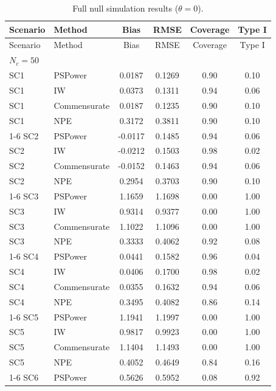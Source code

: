 \scriptsize
\setlength{\tabcolsep}{3pt}
\renewcommand{\arraystretch}{1.08}
\begin{longtable}{llcccc}
\caption{Full null simulation results ($\theta = 0$).}
\label{tab:sim-full-null}\\
\toprule
Scenario & Method & Bias & RMSE & Coverage & Type I \\
\midrule
\endfirsthead
\toprule
Scenario & Method & Bias & RMSE & Coverage & Type I \\
\midrule
\endhead
\multicolumn{6}{l}{$N_c=50$} \\
SC1 & PSPower      & 0.0187 & 0.1269 & 0.90 & 0.10 \\
SC1 & IW           & 0.0373 & 0.1311 & 0.94 & 0.06 \\
SC1 & Commensurate & 0.0187 & 0.1235 & 0.90 & 0.10 \\
SC1 & NPE          & 0.3172 & 0.3811 & 0.90 & 0.10 \\
\cmidrule(lr){1-6}
SC2 & PSPower      & -0.0117 & 0.1485 & 0.94 & 0.06 \\
SC2 & IW           & -0.0212 & 0.1503 & 0.98 & 0.02 \\
SC2 & Commensurate & -0.0152 & 0.1463 & 0.94 & 0.06 \\
SC2 & NPE          & 0.2954 & 0.3703 & 0.90 & 0.10 \\
\cmidrule(lr){1-6}
SC3 & PSPower      & 1.1659 & 1.1698 & 0.00 & 1.00 \\
SC3 & IW           & 0.9314 & 0.9377 & 0.00 & 1.00 \\
SC3 & Commensurate & 1.1022 & 1.1096 & 0.00 & 1.00 \\
SC3 & NPE          & 0.3333 & 0.4062 & 0.92 & 0.08 \\
\cmidrule(lr){1-6}
SC4 & PSPower      & 0.0441 & 0.1582 & 0.96 & 0.04 \\
SC4 & IW           & 0.0406 & 0.1700 & 0.98 & 0.02 \\
SC4 & Commensurate & 0.0355 & 0.1632 & 0.94 & 0.06 \\
SC4 & NPE          & 0.3495 & 0.4082 & 0.86 & 0.14 \\
\cmidrule(lr){1-6}
SC5 & PSPower      & 1.1941 & 1.1997 & 0.00 & 1.00 \\
SC5 & IW           & 0.9817 & 0.9923 & 0.00 & 1.00 \\
SC5 & Commensurate & 1.1404 & 1.1493 & 0.00 & 1.00 \\
SC5 & NPE          & 0.4052 & 0.4649 & 0.84 & 0.16 \\
\cmidrule(lr){1-6}
SC6 & PSPower      & 0.5626 & 0.5952 & 0.08 & 0.92 \\

\end{longtable}
